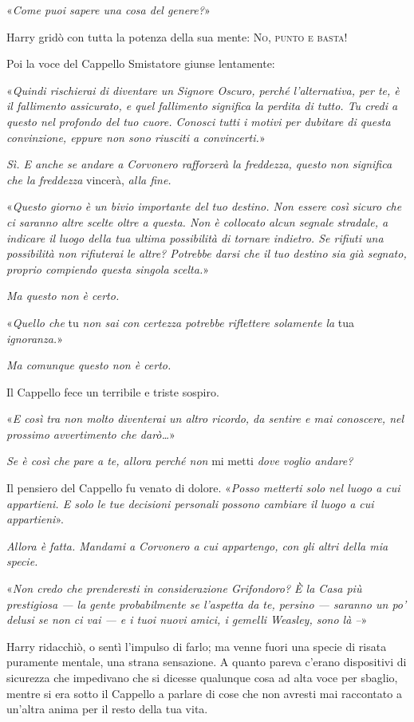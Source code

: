 «\textit{Come puoi sapere una cosa del genere?}»

Harry gridò con tutta la potenza della sua mente: \textsc{No, punto e basta!}

Poi la voce del Cappello Smistatore giunse lentamente:

«\textit{Quindi rischierai di diventare un Signore Oscuro, perché l’alternativa, per te, è il fallimento assicurato, e quel fallimento significa la perdita di tutto. Tu credi a questo nel profondo del tuo cuore. Conosci tutti i motivi per dubitare di questa convinzione, eppure non sono riusciti a convincerti.}»

\textit{Sì. E anche se andare a Corvonero rafforzerà la freddezza, questo non significa che la freddezza} vincerà, \textit{alla fine.}

«\textit{Questo giorno è un bivio importante del tuo destino. Non essere così sicuro che ci saranno altre scelte oltre a questa. Non è collocato alcun segnale stradale, a indicare il luogo della tua ultima possibilità di tornare indietro. Se rifiuti una possibilità non rifiuterai le altre? Potrebbe darsi che il tuo destino sia già segnato, proprio compiendo questa singola scelta.}»

\textit{Ma questo non è certo.}

«\textit{Quello che} tu \textit{non sai con certezza potrebbe riflettere solamente la} tua \textit{ignoranza.}»

\textit{Ma comunque questo non è certo.}

Il Cappello fece un terribile e triste sospiro.

«\textit{E così tra non molto diventerai un altro ricordo, da sentire e mai conoscere, nel prossimo avvertimento che darò…}»

\textit{Se è così che pare a te, allora perché non} mi metti \textit{dove voglio andare?}

Il pensiero del Cappello fu venato di dolore. «\textit{Posso metterti solo nel luogo a cui appartieni. E solo le tue decisioni personali possono cambiare il luogo a cui appartieni}».

\textit{Allora è fatta. Mandami a Corvonero a cui appartengo, con gli altri della mia specie.}

«\textit{Non credo che prenderesti in considerazione Grifondoro? È la Casa più prestigiosa — la gente probabilmente se l’aspetta da te, persino — saranno un po’ delusi se non ci vai — e i tuoi nuovi amici, i gemelli Weasley, sono là –}»

Harry ridacchiò, o sentì l’impulso di farlo; ma venne fuori una specie di risata puramente mentale, una strana sensazione. A quanto pareva c’erano dispositivi di sicurezza che impedivano che si dicesse qualunque cosa ad alta voce per sbaglio, mentre si era sotto il Cappello a parlare di cose che non avresti mai raccontato a un’altra anima per il resto della tua vita.

